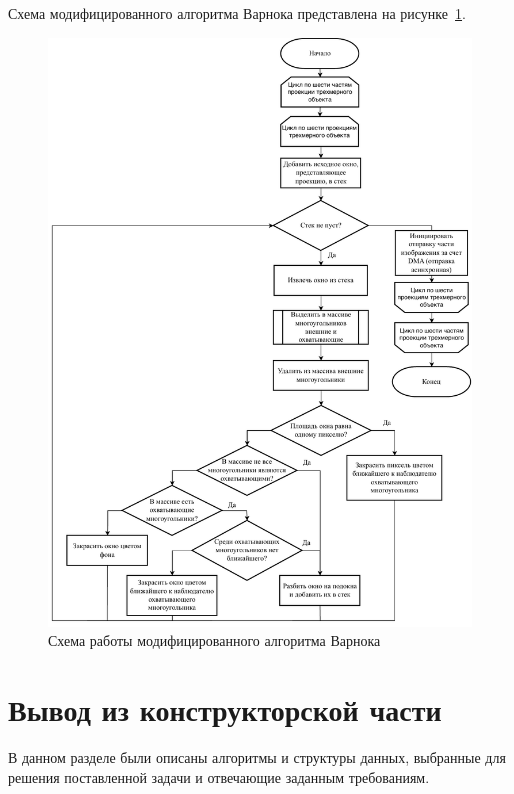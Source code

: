 Схема модифицированного алгоритма Варнока представлена на рисунке~\ref{fig:warnock_modified}.
\begin{figure}[H]
	\centering
	\includegraphics[height=0.75\textheight]{inc/img/warnock_modified.pdf}
	\caption{Схема работы модифицированного алгоритма Варнока}
	\label{fig:warnock_modified}
\end{figure}

\section{Вывод из конструкторской части}
В данном разделе были описаны алгоритмы и структуры данных, выбранные для решения поставленной задачи и отвечающие заданным требованиям. 
